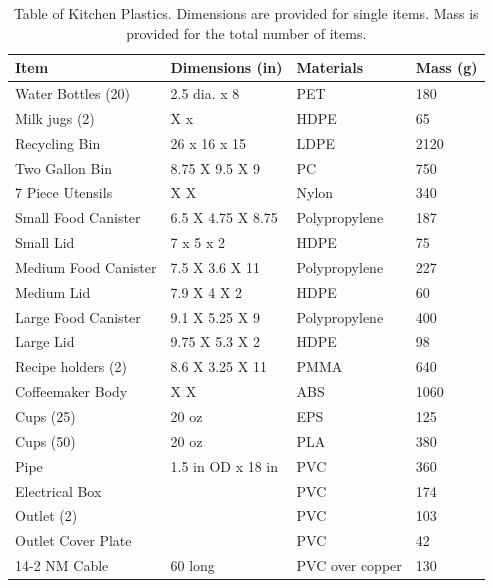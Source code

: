 \documentclass[12pt,oneside]{book}
\begin{document}
\begin{table}[!ht]
	\centering
	\caption{Table of Kitchen Plastics. Dimensions are provided for single items.  Mass is provided for the total number of items.}
	\label{tab:KitPlastics}
	\begin{tabular}{llll}
		\toprule[1.5pt]
		Item 				& Dimensions (in) 	& Materials 										& Mass (g)  \\
		\midrule
		Water Bottles (20) 	& 2.5 dia. x 8  	& PET												&  180      \\
		Milk jugs (2)     	&    X   x   		& HDPE											   	&   65      \\
		Recycling Bin  		& 26 x 16 x 15	    & LDPE						  						& 2120     \\
		Two Gallon Bin  	& 8.75 X 9.5 X 9	& PC 							 					&  750     \\	
		7 Piece Utensils	&  X  X 	 		& Nylon											 	&  340   \\	
		Small Food Canister	& 6.5 X 4.75 X 8.75	& Polypropylene							  			&  187   \\
		Small Lid			& 7 x 5 x 2			& HDPE												&   75  \\
		Medium Food Canister& 7.5 X 3.6 X 11 	& Polypropylene 									&  227   \\
		Medium Lid			& 7.9 X 4 X  2		& HDPE												&   60    \\
		Large Food Canister	& 9.1 X 5.25 X 9	& Polypropylene										&  400	 \\
		Large Lid 			& 9.75 X 5.3 X 2	& HDPE 												&   98    \\
		Recipe holders (2)	& 8.6 X 3.25 X 11   & PMMA												&  640	 \\
		Coffeemaker Body	&   X   X      		& ABS 												& 1060   \\
		Cups (25)			& 20 oz				& EPS												&  125   \\
        Cups (50)			& 20 oz				& PLA  												&  380   \\
        Pipe                & 1.5 in OD x 18 in & PVC 												&  360   \\
        Electrical Box	    &					& PVC 												&  174  \\
        Outlet (2)			& 					& PVC												&  103   \\
        Outlet Cover Plate  & 					& PVC  												&   42   \\
        14-2 NM Cable 		& 60 long			& PVC over copper									&  130  \\
		\bottomrule[1.25pt]
	\end{tabular}
\end{table}
\end{document}

